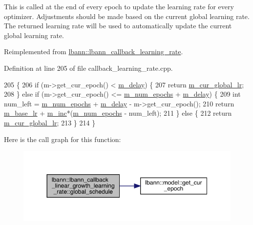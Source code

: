 This is called at the end of every epoch to update the learning rate for every optimizer. Adjustments should be made based on the current global learning rate. The returned learning rate will be used to automatically update the current global learning rate. 

Reimplemented from \hyperlink{classlbann_1_1lbann__callback__learning__rate_a7869b93e5963d6f76da68d8c8137b979}{lbann\+::lbann\+\_\+callback\+\_\+learning\+\_\+rate}.



Definition at line 205 of file callback\+\_\+learning\+\_\+rate.\+cpp.


\begin{DoxyCode}
205                                                                           \{
206   \textcolor{keywordflow}{if} (m->get\_cur\_epoch() < \hyperlink{classlbann_1_1lbann__callback__linear__growth__learning__rate_a0a0a9c7f9964e3f8693706800fcdf06a}{m\_delay}) \{
207     \textcolor{keywordflow}{return} \hyperlink{classlbann_1_1lbann__callback__learning__rate_a97194f282c29a748c915d9811a8a99fb}{m\_cur\_global\_lr};
208   \} \textcolor{keywordflow}{else} \textcolor{keywordflow}{if} (m->get\_cur\_epoch() <= \hyperlink{classlbann_1_1lbann__callback__linear__growth__learning__rate_ac583819b3ee7fad93b9b96b44dfb4307}{m\_num\_epochs} + \hyperlink{classlbann_1_1lbann__callback__linear__growth__learning__rate_a0a0a9c7f9964e3f8693706800fcdf06a}{m\_delay}) \{
209     \textcolor{keywordtype}{int} num\_left = \hyperlink{classlbann_1_1lbann__callback__linear__growth__learning__rate_ac583819b3ee7fad93b9b96b44dfb4307}{m\_num\_epochs} + \hyperlink{classlbann_1_1lbann__callback__linear__growth__learning__rate_a0a0a9c7f9964e3f8693706800fcdf06a}{m\_delay} - m->get\_cur\_epoch();
210     \textcolor{keywordflow}{return} \hyperlink{classlbann_1_1lbann__callback__linear__growth__learning__rate_a2fe23a59744da5c0c737eb9d301bc23b}{m\_base\_lr} + \hyperlink{classlbann_1_1lbann__callback__linear__growth__learning__rate_ad68e1fbbe86eb692cf26d0d4a452c469}{m\_inc}*(\hyperlink{classlbann_1_1lbann__callback__linear__growth__learning__rate_ac583819b3ee7fad93b9b96b44dfb4307}{m\_num\_epochs} - num\_left);
211   \} \textcolor{keywordflow}{else} \{
212     \textcolor{keywordflow}{return} \hyperlink{classlbann_1_1lbann__callback__learning__rate_a97194f282c29a748c915d9811a8a99fb}{m\_cur\_global\_lr};
213   \}
214 \}
\end{DoxyCode}
Here is the call graph for this function\+:\nopagebreak
\begin{figure}[H]
\begin{center}
\leavevmode
\includegraphics[width=350pt]{classlbann_1_1lbann__callback__linear__growth__learning__rate_ad292e2e7f4078162ed93b6e05d94e0e4_cgraph}
\end{center}
\end{figure}
